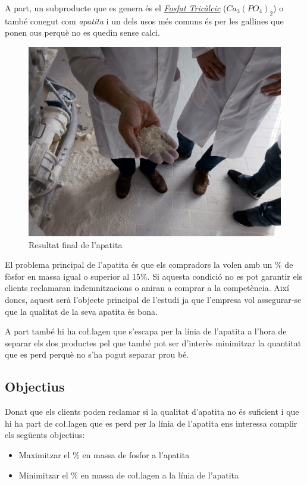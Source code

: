 \documentclass[a4paper]{article}
\begin{document}
A part, un subproducte que es genera és el \emph{\href{https://es.wikipedia.org/wiki/Fosfato_tric\%C3\%A1lcico}{Fosfat Tricàlcic}} ($Ca_3 (PO_4)_2$) o també conegut com \emph{apatita} i un dels usos més comuns és per les gallines que ponen ous perquè no es quedin sense calci. 

\begin{figure}[H]
	\centering
	\includegraphics[width=.8\textwidth]{images/protein/final}
	\caption{Resultat final de l'apatita}
	\label{fig:Final}
\end{figure} 	

El problema principal de l'apatita és que els compradors la volen amb un \% de fòsfor en massa igual o superior al 15\%. Si aquesta condició no es pot garantir els clients reclamaran indemnitzacions o aniran a comprar a la competència. Així doncs, aquest serà l'objecte principal de l'estudi ja que l'empresa vol assegurar-se que la qualitat de la seva apatita és bona. 

A part també hi ha co\l.lagen que s'escapa per la línia de l'apatita a l'hora de separar els dos productes pel que també pot ser d'interès minimitzar la quantitat que es perd perquè no s'ha pogut separar prou bé.

\subsection{Objectius}
Donat que els clients poden reclamar si la qualitat d'apatita no és suficient i que hi ha part de co\l.lagen que es perd per la línia de l'apatita ens interessa complir els següents objectius:

\begin{itemize}
	\item Maximitzar el \% en massa de fosfor a l'apatita
	\item Minimitzar el \% en massa de co\l.lagen a la línia de l'apatita
\end{itemize}
\end{document}
